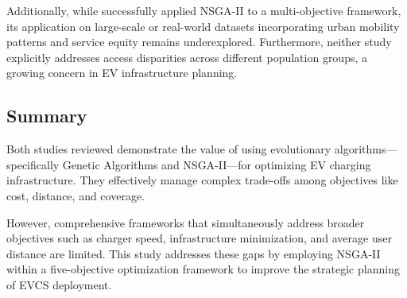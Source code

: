 Additionally, while \citet{A multi-objective optimization model for electric vehicle charging station location planning} successfully applied NSGA-II to a multi-objective framework, its application on large-scale or real-world datasets incorporating urban mobility patterns and service equity remains underexplored. Furthermore, neither study explicitly addresses access disparities across different population groups, a growing concern in EV infrastructure planning.

\subsection{Summary}

Both studies reviewed demonstrate the value of using evolutionary algorithms—specifically Genetic Algorithms and NSGA-II—for optimizing EV charging infrastructure. They effectively manage complex trade-offs among objectives like cost, distance, and coverage. 

However, comprehensive frameworks that simultaneously address broader objectives such as charger speed, infrastructure minimization, and average user distance are limited. This study addresses these gaps by employing NSGA-II within a five-objective optimization framework to improve the strategic planning of EVCS deployment.


